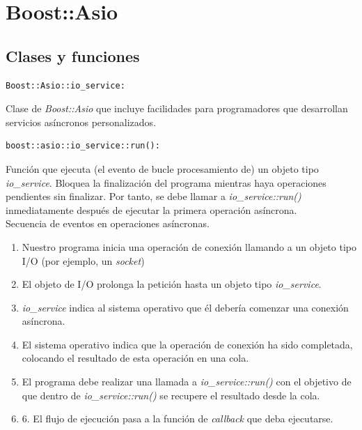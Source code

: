 \documentclass[a4paper,11pt,titlepage,halfparskip,cleardoubleempty]{scrbook}
\begin{document}
\chapter{Boost::Asio}
\section{Clases y funciones}


\begin{lstlisting}[style=C++]
Boost::Asio::io_service:
\end{lstlisting}

Clase de \textit{Boost::Asio} que incluye facilidades para programadores que desarrollan servicios asíncronos personalizados.\\

\begin{lstlisting}[style=C++]
boost::asio::io_service::run():
\end{lstlisting}
Función que ejecuta (el evento de bucle procesamiento de) un objeto tipo  \textit{io\_service}. Bloquea la finalización del programa mientras haya operaciones pendientes sin finalizar. Por tanto, se debe llamar a  \textit{io\_service::run()} inmediatamente después de ejecutar la primera operación asíncrona.\\


Secuencia de eventos en operaciones asíncronas.
\begin{enumerate}
\item Nuestro programa inicia una operación de conexión llamando a un objeto tipo I/O (por ejemplo, un  \textit{socket})
\item El objeto de I/O prolonga la petición hasta un objeto tipo  \textit{io\_service}.
\item   \textit{io\_service} indica al sistema operativo que él debería comenzar una conexión asíncrona.
\item El sistema operativo indica que la operación de conexión ha sido completada, colocando el resultado de esta operación en una cola.
\item El programa debe realizar una llamada a  \textit{io\_service::run()} con el objetivo de que dentro de  \textit{io\_service::run()} se recupere el resultado desde la cola.
\item 6. El flujo de ejecución pasa a la función de  \textit{callback} que deba ejecutarse.
\end{enumerate}
\end{document}
